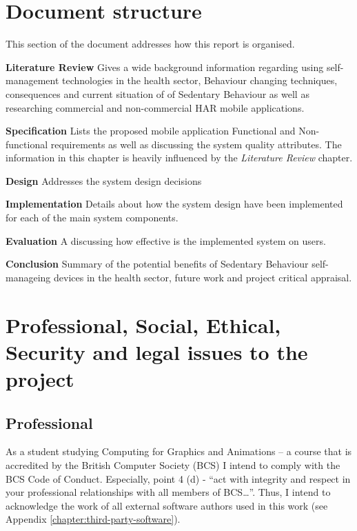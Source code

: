     \section{Document structure}
    This section of the document addresses how this report is organised.\newline
    
    \textbf{Literature Review} Gives a wide background information regarding using self-management technologies in the health sector, Behaviour changing techniques, consequences and current situation of of Sedentary Behaviour as well as researching commercial and non-commercial HAR mobile applications.\newline
    
    
    \textbf{Specification} Lists the proposed mobile application Functional and Non-functional requirements as well as discussing the system quality attributes. The information in this chapter is heavily influenced by the \textit{Literature Review} chapter.\newline
    
    
    \textbf{Design} Addresses the system design decisions\newline
    
    
    \textbf{Implementation} Details about how the system design have been implemented for each of the main system components.\newline
    
    
    \textbf{Evaluation} A discussing how effective is the implemented system on users.\newline
    
    
    \textbf{Conclusion} Summary of the potential benefits of Sedentary Behaviour self-manageing devices in the health sector, future work and project critical appraisal.\newline
    
    
    \section{Professional, Social, Ethical, Security and legal issues to the project}
    
    \subsection{Professional}
    As a student studying Computing for Graphics and Animations – a course that is accredited by the British Computer Society (BCS) I intend to comply with the BCS Code of Conduct. Especially, point 4 (d) \citep{bcs_2017} - “act with integrity and respect in your professional relationships with all members of BCS…”. Thus, I intend to acknowledge the work of all external software authors used in this work (see Appendix \ref{chapter:third-party-software}).

